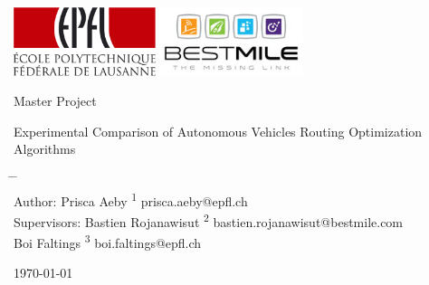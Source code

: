 \documentclass[12pt,a4paper]{article}
\begin{document}
\thispagestyle{empty}

  \vspace{-3cm}
  \includegraphics[height=2cm]{./images/EPFL.pdf}
  \hfill \includegraphics[height=2cm]{./images/bestmile.jpg}
  
  \hrulefill
  \vspace{3.0cm}

\begin{center}
 Master Project
 
 \LARGE
 \bigskip
 Experimental Comparison of Autonomous Vehicles Routing Optimization Algorithms
\end{center}



\vspace{2.0cm}
\begin{tabbing}
\hspace*{3cm}		\=	\hspace*{5cm}							\=	\hspace*{3cm} \\
Author:			\>	Prisca Aeby		  \textsuperscript{1}	\> prisca.aeby@epfl.ch\\
Supervisors:		\>	Bastien Rojanawisut	  \textsuperscript{2}	\> bastien.rojanawisut@bestmile.com\\	
					\>	Boi Faltings    \textsuperscript{3}	\> boi.faltings@epfl.ch\\
\end{tabbing}



\begin{center}

\today
\end{center}

\vfill
\hrulefill
\end{document}
